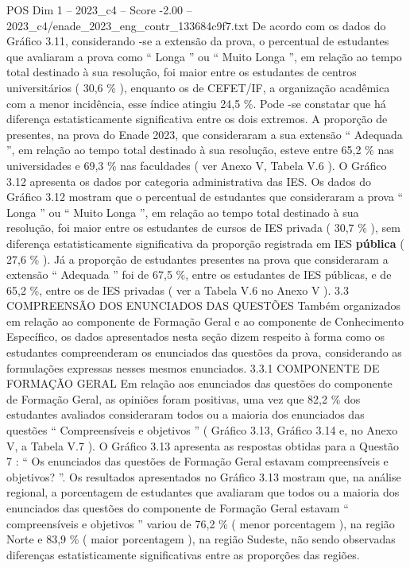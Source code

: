 \begin{textsample}{POS Dim 1 – 2023\_c4 – Score -2.00 – 2023\_c4/enade\_2023\_eng\_contr\_133684c9f7.txt}
De acordo com os dados do Gráfico 3.11, considerando -se a extensão da prova, o percentual de estudantes que avaliaram a prova como “ Longa ” ou “ Muito Longa ”, em relação ao tempo total destinado à sua resolução, foi maior entre os estudantes de centros universitários ( 30,6 \% ), enquanto os de CEFET/IF, a organização acadêmica com a menor incidência, esse índice atingiu 24,5 \%.
Pode -se constatar que há diferença estatisticamente significativa entre os dois extremos.
A proporção de presentes, na prova do Enade 2023, que consideraram a sua extensão “ Adequada ”, em relação ao tempo total destinado à sua resolução, esteve entre 65,2 \% nas universidades e 69,3 \% nas faculdades ( ver Anexo V, Tabela V.6 ).
O Gráfico 3.12 apresenta os dados por categoria administrativa das IES.
Os dados do Gráfico 3.12 mostram que o percentual de estudantes que consideraram a prova “ Longa ” ou “ Muito Longa ”, em relação ao tempo total destinado à sua resolução, foi maior entre os estudantes de cursos de IES privada ( 30,7 \% ), sem diferença estatisticamente significativa da proporção registrada em IES \textbf{pública} ( 27,6 \% ).
Já a proporção de estudantes presentes na prova que consideraram a extensão “ Adequada ” foi de 67,5 \%, entre os estudantes de IES públicas, e de 65,2 \%, entre os de IES privadas ( ver a Tabela V.6 no Anexo V ). 3.3 COMPREENSÃO DOS ENUNCIADOS DAS QUESTÕES Também organizados em relação ao componente de Formação Geral e ao componente de Conhecimento Específico, os dados apresentados nesta seção dizem respeito à forma como os estudantes compreenderam os enunciados das questões da prova, considerando as formulações expressas nesses mesmos enunciados. 3.3.1 COMPONENTE DE FORMAÇÃO GERAL Em relação aos enunciados das questões do componente de Formação Geral, as opiniões foram positivas, uma vez que 82,2 \% dos estudantes avaliados consideraram todos ou a maioria dos enunciados das questões “ Compreensíveis e objetivos ” ( Gráfico 3.13, Gráfico 3.14 e, no Anexo V, a Tabela V.7 ).
O Gráfico 3.13 apresenta as respostas obtidas para a Questão 7 : “ Os enunciados das questões de Formação Geral estavam compreensíveis e objetivos? ”.
Os resultados apresentados no Gráfico 3.13 mostram que, na análise regional, a porcentagem de estudantes que avaliaram que todos ou a maioria dos enunciados das questões do componente de Formação Geral estavam “ compreensíveis e objetivos ” variou de 76,2 \% ( menor porcentagem ), na região Norte e 83,9 \% ( maior porcentagem ), na região Sudeste, não sendo observadas diferenças estatisticamente significativas entre as proporções das regiões.

\end{textsample}
